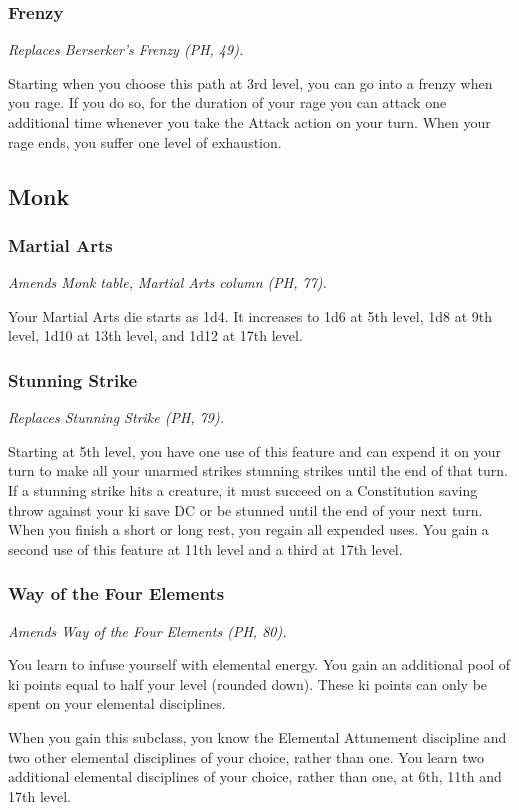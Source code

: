 \documentclass[letterpaper,twocolumn,openany,nodeprecatedcode]{dndbook}
\begin{document}
\subsubsection{Frenzy}
\textit{Replaces Berserker's Frenzy (PH, 49).}

Starting when you choose this path at 3rd level, you can go into a frenzy when you rage. If you do so, for the duration of your rage you can attack one additional time whenever you take the Attack action on your turn. When your rage ends, you suffer one level of exhaustion.

\subsection{Monk}

\subsubsection{Martial Arts}
\textit{Amends Monk table, Martial Arts column (PH, 77).}

Your Martial Arts die starts as 1d4. It increases to 1d6 at 5th level, 1d8 at 9th level, 1d10 at 13th level, and 1d12 at 17th level.

\subsubsection{Stunning Strike}
\textit{Replaces Stunning Strike (PH, 79).}

Starting at 5th level, you have one use of this feature and can expend it on your turn to make all your unarmed strikes stunning strikes until the end of that turn. If a stunning strike hits a creature, it must succeed on a Constitution saving throw against your ki save DC or be stunned until the end of your next turn. When you finish a short or long rest, you regain all expended uses. You gain a second use of this feature at 11th level and a third at 17th level. 

\subsubsection{Way of the Four Elements}
\textit{Amends Way of the Four Elements (PH, 80).}

You learn to infuse yourself with elemental energy. You gain an additional pool of ki points equal to half your level (rounded down). These ki points can only be spent on your elemental disciplines.

When you gain this subclass, you know the Elemental Attunement discipline and two other elemental disciplines of your choice, rather than one. You learn two additional elemental disciplines of your choice, rather than one, at 6th, 11th and 17th level.
\end{document}
